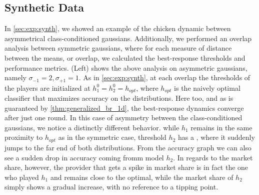 \subsection{Synthetic Data}
\label{app:add_exps:synth}

In \cref{sec:exp:synth}, we showed an example of the chicken dynamic between asymmetrical class-conditioned gaussians. Additionally, we performed an overlap analysis between symmetric gaussians, where for each measure of distance between the means, or overlap, we calculated the best-response thresholds and performance metrics.
 (Left) shows the above analysis on asymmetric gaussians, namely $\sigma_{-1} = 2, \sigma_{+1} =1$.
As in \cref{sec:exp:synth}, at each overlap the thresholds of the players are initialized at $h_1^0 = h_2^0 = h_{opt}$, where $h_{opt}$ is the naively optimal classifier that maximizes accuracy on the distributions.
Here too, and as is guaranteed by \cref{thm:generalized_br_1d}, the best-response dynamics converge after just one round. 
In this case of asymmetry between the class-conditioned gaussians, we notice a distinctly different behavior.
while $h_1$ remains in the same proximity to $h_{opt}$ as in the symmetric case, threshold $h_2$ has a , where it suddenly jumps to the far end of both distributions.
From the accuracy graph we can also see a sudden drop in accuracy coming fromm  model $h_2$. In regards to the market share, however, the provider that gets a spike in market share is in fact the one who played $h_1$ and remains close to the optimal, while the market share of $h_2$ simply shows a gradual increase, with no reference to a tipping point.

